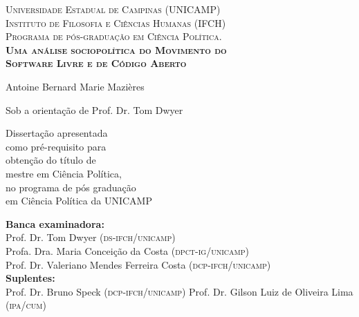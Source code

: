 
\begin{center}
\textsc{
Universidade Estadual de Campinas (UNICAMP) \\
Instituto de Filosofia e Ciências Humanas (IFCH) \\
Programa de p\'os-gradua\c c\~ao em Ci\^encia Pol\'itica. \\

\textbf{Uma an\'alise sociopol\'itica do Movimento do \\ Software Livre e de C\'odigo Aberto}
}

Antoine Bernard Marie Mazières

Sob a orienta\c c\~ao de Prof. Dr. Tom Dwyer
\end{center}

\begin{flushright}
Disserta\c c\~ao apresentada \\ como pré-requisito para \\ obten\c c\~ao do t\'itulo de \\ mestre em Ci\^encia Pol\'itica, \\ no programa de p\'os gradua\c c\~ao \\ em Ci\^encia Pol\'itica da UNICAMP
\end{flushright}

\begin{flushleft}
\textbf{Banca examinadora:}\\
Prof. Dr. Tom Dwyer (\textsc{ds-ifch/unicamp})\\
Profa. Dra. Maria Concei\c c\~ao da Costa (\textsc{dpct-ig/unicamp}) \\
Prof. Dr. Valeriano Mendes Ferreira Costa (\textsc{dcp-ifch/unicamp}) \\

\textbf{Suplentes:}\\
Prof. Dr. Bruno Speck (\textsc{dcp-ifch/unicamp})
Prof. Dr. Gilson Luiz de Oliveira Lima (\textsc{ipa/cum})
\end{flushleft}
